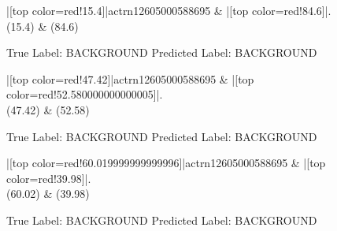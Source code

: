 \documentclass[a4paper, landscape]{article}
\begin{document}
\clearpage
\begin{figure}
\begin{center}
\begin{dependency}
\begin{deptext}
|[top color=red!15.4]|actrn12605000588695 \& |[top color=red!84.6]|.\\
(15.4) \& (84.6)\\
\end{deptext}
\end{dependency}
\end{center}
\caption{True Label: BACKGROUND Predicted Label: BACKGROUND}
\end{figure}
\clearpage
\begin{figure}
\begin{center}
\begin{dependency}
\begin{deptext}
|[top color=red!47.42]|actrn12605000588695 \& |[top color=red!52.580000000000005]|.\\
(47.42) \& (52.58)\\
\end{deptext}
\end{dependency}
\end{center}
\caption{True Label: BACKGROUND Predicted Label: BACKGROUND}
\end{figure}
\clearpage
\begin{figure}
\begin{center}
\begin{dependency}
\begin{deptext}
|[top color=red!60.019999999999996]|actrn12605000588695 \& |[top color=red!39.98]|.\\
(60.02) \& (39.98)\\
\end{deptext}
\end{dependency}
\end{center}
\caption{True Label: BACKGROUND Predicted Label: BACKGROUND}
\end{figure}
\clearpage
\end{document}
